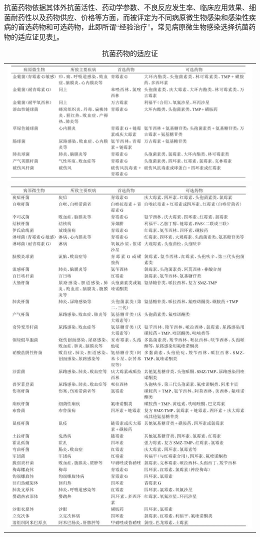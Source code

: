 抗菌药物依据其体外抗菌活性、药动学参数、不良反应发生率、临床应用效果、细菌耐药性以及药物供应、价格等方面，而被评定为不同病原微生物感染和感染性疾病的首选药物和可选药物，此即所谓“经验治疗”。常见病原微生物感染选择抗菌药物的适应证见表\ref{tab154-3}。

\begin{longtable}{c}
 \caption{抗菌药物的适应证}
 \label{tab154-3}
 \endfirsthead
 \caption[]{抗菌药物的适应证}
 \endhead
 \includegraphics[width=\textwidth,height=\textheight,keepaspectratio]{./images/Image00589.jpg}\\
 \includegraphics[width=\textwidth,height=\textheight,keepaspectratio]{./images/Image00590.jpg}
 \end{longtable}

